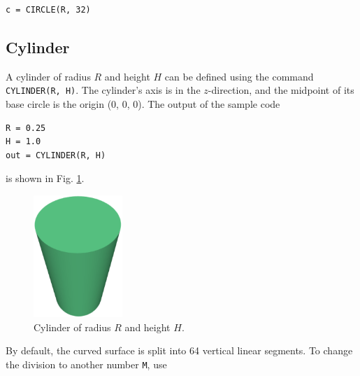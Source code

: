 \begin{bbox}
\begin{verbatim}
c = CIRCLE(R, 32)
\end{verbatim}
\end{bbox}
\vspace{6mm}

\noindent

\subsection{Cylinder}

A cylinder of radius $R$ and height $H$ can be defined using 
the command {\tt CYLINDER(R, H)}. The cylinder's axis is in 
the $z$-direction, and the midpoint of its base circle is the 
origin (0, 0, 0). The output of the sample code\\

\begin{bbox}
\begin{verbatim}
R = 0.25
H = 1.0
out = CYLINDER(R, H)
\end{verbatim}
\end{bbox}
\vspace{6mm}

\noindent
is shown in Fig. \ref{fig:cyl-1}.

\begin{figure}[!ht]
\begin{center}
\includegraphics[width=0.3\textwidth]{img/cyl-1.png}
\end{center}
\vspace{-4mm}
\caption{Cylinder of radius $R$ and height $H$.}
\label{fig:cyl-1}
\end{figure}
\noindent
By default, the curved surface is split into 64 vertical linear segments. To 
change the division to another number {\tt M}, use\\

